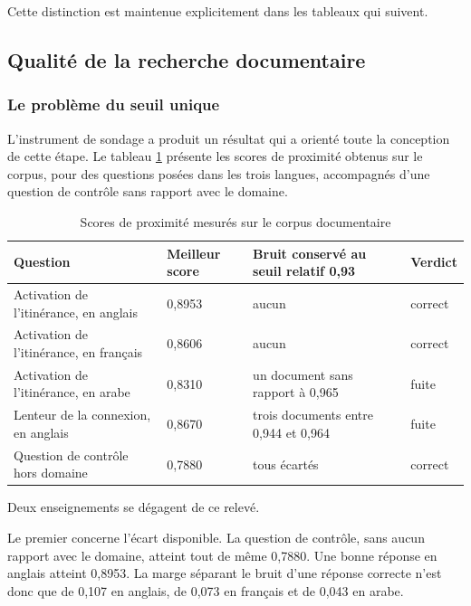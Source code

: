 Cette distinction est maintenue explicitement dans les tableaux qui suivent.

\subsection{Qualité de la recherche documentaire}

\subsubsection{Le problème du seuil unique}

L'instrument de sondage a produit un résultat qui a orienté toute la conception de cette étape. Le tableau \ref{tab:rag-mesures} présente les scores de proximité obtenus sur le corpus, pour des questions posées dans les trois langues, accompagnés d'une question de contrôle sans rapport avec le domaine.

\begin{table}[H]
\centering
\renewcommand{\arraystretch}{1.25}
\begin{tabular}{|p{5.4cm}|p{2.1cm}|p{3.4cm}|p{3.0cm}|}
\hline
\textbf{Question} & \textbf{Meilleur score} & \textbf{Bruit conservé au seuil relatif 0,93} & \textbf{Verdict} \\
\hline
Activation de l'itinérance, en anglais & 0,8953 & aucun & correct \\
\hline
Activation de l'itinérance, en français & 0,8606 & aucun & correct \\
\hline
Activation de l'itinérance, en arabe & 0,8310 & un document sans rapport à 0,965 & fuite \\
\hline
Lenteur de la connexion, en anglais & 0,8670 & trois documents entre 0,944 et 0,964 & fuite \\
\hline
Question de contrôle hors domaine & 0,7880 & tous écartés & correct \\
\hline
\end{tabular}
\caption{Scores de proximité mesurés sur le corpus documentaire}
\label{tab:rag-mesures}
\end{table}

Deux enseignements se dégagent de ce relevé.

Le premier concerne l'écart disponible. La question de contrôle, sans aucun rapport avec le domaine, atteint tout de même 0,7880. Une bonne réponse en anglais atteint 0,8953. La marge séparant le bruit d'une réponse correcte n'est donc que de 0,107 en anglais, de 0,073 en français et de 0,043 en arabe.


